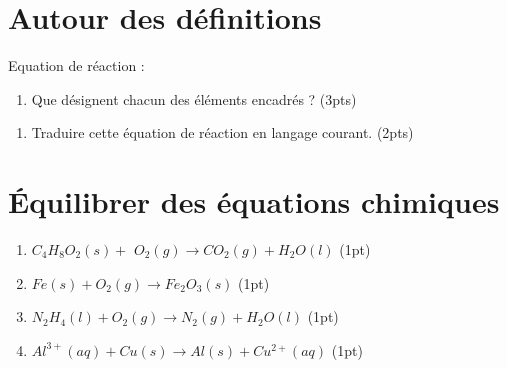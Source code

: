 \documentclass[a4paper,11pt,fleqn]{scrartcl}%
\begin{document}
	\maketitle
	\section{Autour des définitions}
    Equation de réaction : 
     \fbox{$\rightarrow$} 
    \begin{enumerate}
        \item Que désignent chacun des éléments encadrés ? (3pts)
    \end{enumerate}
    \noindent\fbox{
    \begin{minipage}{\textwidth}
        \TextField[
            multiline=true,
            width=\linewidth,
            height=6em
        ]{}
    \end{minipage}
}
    \begin{enumerate}[resume]
        \item Traduire cette équation de réaction en langage courant. (2pts)
    \end{enumerate}
\noindent\fbox{
    \begin{minipage}{\textwidth}
        \TextField[
            multiline=true,
            width=\linewidth,
            height=6em
        ]{}
    \end{minipage}
}
    \section{Équilibrer des équations chimiques}
    \begin{enumerate}
        \item  \TextField[width=2em]{} $C_4H_{8}O_2(s) + $ \TextField[width=2em]{}$O_2(g) \rightarrow $\TextField[width=2em]{}$CO_2(g) + $\TextField[width=2em]{}$H_2O(l)$ (1pt)
        \item \TextField[width=2em]{}$Fe(s) + $\TextField[width=2em]{}$O_2(g) \rightarrow $\TextField[width=2em]{}$Fe_2O_3(s)$ (1pt)
        \item \TextField[width=2em]{}$N_2H_4(l) + $\TextField[width=2em]{}$O_2(g) \rightarrow $\TextField[width=2em]{}$N_2(g) + $\hspace{2em}$H_2O(l)$ (1pt)
        \item \TextField[width=2em]{}$Al^{3+}(aq) + $\TextField[width=2em]{}$Cu(s) \rightarrow $\TextField[width=2em]{}$Al(s) + $\TextField[width=2em]{}$Cu^{2+}(aq)$ (1pt)
    \end{enumerate}
\end{document}
